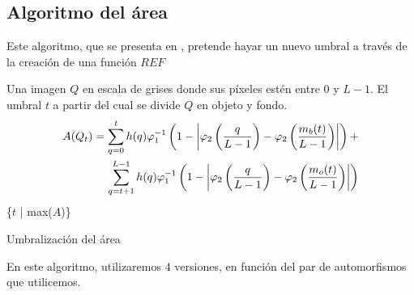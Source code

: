 \subsection{Algoritmo del área}

Este algoritmo, que se presenta en \cite{art:barrenechea}, pretende hayar un nuevo umbral a través de la creación de una función $REF$ 

\begin{algorithm}
\begin{algorithmic}[1]
\REQUIRE Una imagen $Q$ en escala de grises donde sus píxeles estén entre $0$ y $L-1$.
\ENSURE El umbral $t$ a partir del cual se divide $Q$ en objeto y fondo.
\STATE \begin{equation*}\begin{split}
A(Q_t)= \sum_{q=0}^{t} h(q)\varphi_1^{-1}\left(1-\left\vert\varphi_2\left(\frac{q}{L-1}\right)-\varphi_2\left(\frac{m_b(t)}{L-1}\right)\right\vert\right) + \\ \sum_{q=t+1}^{L-1} h(q)\varphi_1^{-1}\left(1-\left\vert\varphi_2\left(\frac{q}{L-1}\right)-\varphi_2\left(\frac{m_o(t)}{L-1}\right)\right\vert\right)
\end{split}\end{equation*}
\ENDFOR
\RETURN \{$t$ | max($A$)\}
\end{algorithmic}
\caption{Umbralización del área}\label{alg:algoritmo2}
\end{algorithm}

En este algoritmo, utilizaremos 4 versiones, en función del par de automorfismos que utilicemos. 



